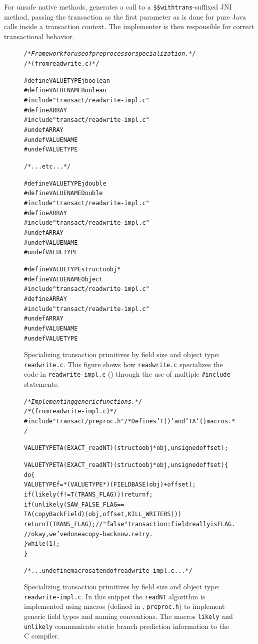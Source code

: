 For unsafe native methods, \flex generates a call to a
\texttt{\$\$withtrans}-suffixed JNI method, passing the transaction as
the first parameter as is done for pure Java calls inside a
transaction context.  The implementer is then responsible for correct
transactional behavior.

\begin{figure}\sis\fontsize{8}{9}\begin{alltt}
\textit{/* Framework for use of preprocessor specialization. */}
/* (from readwrite.c) */

#define VALUETYPE jboolean
#define VALUENAME Boolean
#include "transact/readwrite-impl.c"
#define ARRAY
#include "transact/readwrite-impl.c"
#undef ARRAY
#undef VALUENAME
#undef VALUETYPE

/* ... etc ... */

#define VALUETYPE jdouble
#define VALUENAME Double
#include "transact/readwrite-impl.c"
#define ARRAY
#include "transact/readwrite-impl.c"
#undef ARRAY
#undef VALUENAME
#undef VALUETYPE

#define VALUETYPE struct oobj *
#define VALUENAME Object
#include "transact/readwrite-impl.c"
#define ARRAY
#include "transact/readwrite-impl.c"
#undef ARRAY
#undef VALUENAME
#undef VALUETYPE
\end{alltt}
\caption[Specializing transaction primitives by field size and object
  type (\texttt{readwrite.c}).]{
Specializing transaction primitives by field size and object type:
  \texttt{readwrite.c}.
This figure shows how \texttt{readwrite.c} specializes the code in
\texttt{readwrite-impl.c} () through the use of multiple 
\texttt{\#include} statements.}
\label{fig:special1}
\end{figure}
\begin{figure}\sis\fontsize{8}{9}\begin{alltt}
\textit{/* Implementing generic functions. */}
/* (from readwrite-impl.c) */
#include "transact/preproc.h" /* Defines 'T()' and 'TA'() macros. */

VALUETYPE TA(EXACT_readNT)(struct oobj *obj, unsigned offset);

VALUETYPE TA(EXACT_readNT)(struct oobj *obj, unsigned offset) \{
  do \{
    VALUETYPE f = *(VALUETYPE*)(FIELDBASE(obj) + offset);
    if (likely(f!=T(TRANS_FLAG))) return f;
    if (unlikely(SAW_FALSE_FLAG ==
                 TA(copyBackField)(obj, offset, KILL_WRITERS)))
      return T(TRANS_FLAG); // "false" transaction: field really is FLAG.
    // okay, we've done a copy-back now.  retry.
  \} while(1);
\}

/* ... undefine macros at end of readwrite-impl.c ... */\end{alltt}
\caption[Specializing transaction primitives by field size and object
 type (\texttt{readwrite-impl.c}).]{
Specializing transaction primitives by field size and object type:
 \texttt{readwrite-impl.c}.  In this snippet the \texttt{readNT} algorithm is
 implemented using macros (defined in ,
 \texttt{preproc.h}) to implement generic field types and naming
 conventions.  The macros \texttt{likely} and
 \texttt{unlikely} communicate static branch
 prediction information to the C compiler.}
\label{fig:special2}
\end{figure}
